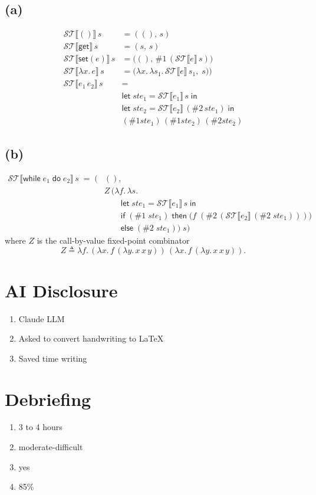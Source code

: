 \documentclass[11pt]{article}
\newcommand{\ST}[1]{\mathcal{ST}\llbracket #1 \rrbracket}
\newcommand{\lam}[2]{\lambda #1.\,#2}
\newcommand{\defeq}{\triangleq}
\newcommand{\kw}[1]{\mathsf{#1}}
\begin{document}
\subsection*{(a)}
\begin{align*}
\ST{()}\,s &= ((),\, s)\\
\ST{\kw{get}}\,s &= (s,\, s)\\
\ST{\kw{set}(e)}\,s &= \big((),\, \#1\,(\ST{e}\,s)\big)\\
  \ST{\lam{x}{e}}\,s &= \big(\lam{x}{\lam{s_1}{\ST{e}\,s_1}},\; s)\big)\\[4pt]
\ST{e_1\, e_2}\,s &=\\
  & \kw{let}\; ste_1 = \ST{e_1}\, s\; \kw{in}\\
  & \kw{let}\; ste_2 = \ST{e_2}\, (\#2\, ste_1)\; \kw{in}\\
  & (\#1 ste_1)\, (\#1 ste_2)\, (\#2 ste_2)
\end{align*}

\subsection*{(b)}
\begin{align*}
\ST{\kw{while}\; e_1\; \kw{do}\; e_2}\,s \;=\; \Big(&(),\\
&Z\,\big(\lam{f}{\lam{s}{\\
&\qquad \kw{let}\; \mathit{ste}_1 = \ST{e_1}\,s\; \kw{in}\\
&\qquad \kw{if}\; (\#1\;\mathit{ste}_1)\; \kw{then}\;
        \big(f\;(\#2\,(\ST{e_2}\,(\#2\;\mathit{ste}_1)))\big)\\
&\qquad \kw{else}\; (\#2\;\mathit{ste}_1)}}\big)\; s\Big)
\end{align*}
where $Z$ is the call-by-value fixed-point combinator
\[
Z \defeq \lam{f}{(\lam{x}{f\,(\lam{y}{x\,x\,y})})\,(\lam{x}{f\,(\lam{y}{x\,x\,y})})}.
\]

\section*{AI Disclosure}
\begin{enumerate}
\item Claude LLM
\item Asked to convert handwriting to LaTeX
\item Saved time writing
\end{enumerate}
\section*{Debriefing}
\begin{enumerate}
\item 3 to 4 hours
\item moderate-difficult
\item yes
\item 85\%
\end{enumerate}
\end{document}
